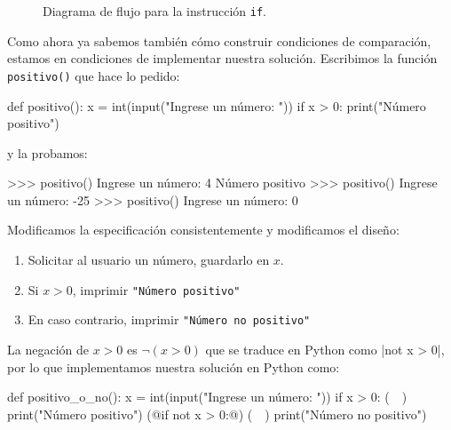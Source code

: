 \begin{figure}[hbt]
\caption{Diagrama de flujo para la instrucción \texttt{if}.}
\label{flujo-if}
\end{figure}

Como ahora ya sabemos también cómo construir condiciones de comparación,
estamos en condiciones de implementar nuestra solución. Escribimos la
función \lstinline+positivo()+ que hace lo pedido:

\begin{codigo-python-sn}
def positivo():
    x = int(input("Ingrese un número: "))
    if x > 0:
        print("Número positivo")
\end{codigo-python-sn}
y la probamos:

\begin{codigo-python-sn}
>>> positivo()
Ingrese un número: 4
Número positivo
>>> positivo()
Ingrese un número: -25
>>> positivo()
Ingrese un número: 0
\end{codigo-python-sn}


Modificamos la especificación consistentemente y modificamos el diseño:

\begin{enumerate}
\item Solicitar al usuario un número, guardarlo en $x$.
\item Si $x > 0$, imprimir \lstinline!"Número positivo"!
\item En caso contrario, imprimir \lstinline!"Número no positivo"!
\end{enumerate}

La negación de $x> 0 $ es $\neg(x > 0)$ que se traduce en Python como
|not x > 0|, por lo que implementamos nuestra solución en
Python como:

\begin{codigo-python-sn}
def positivo_o_no():
    x = int(input("Ingrese un número: "))
    if x > 0: (~~)
       print("Número positivo")
    (@if not x > 0:@) (~~)
       print("Número no positivo")
\end{codigo-python-sn}

